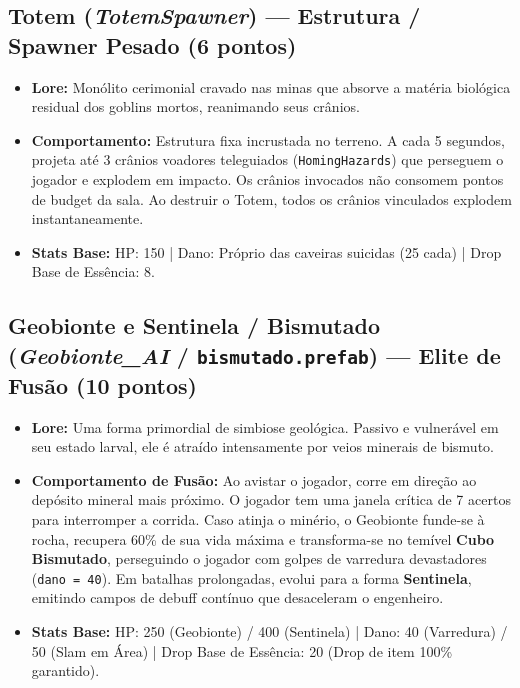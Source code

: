 \documentclass[a4paper,12pt]{report}
\begin{document}
\subsection{Totem (\textit{TotemSpawner}) --- Estrutura / Spawner Pesado (6 pontos)}
\begin{itemize}
    \item \textbf{Lore:} Monólito cerimonial cravado nas minas que absorve a matéria biológica residual dos goblins mortos, reanimando seus crânios.
    \item \textbf{Comportamento:} Estrutura fixa incrustada no terreno. A cada 5 segundos, projeta até 3 crânios voadores teleguiados (\texttt{HomingHazards}) que perseguem o jogador e explodem em impacto. Os crânios invocados não consomem pontos de budget da sala. Ao destruir o Totem, todos os crânios vinculados explodem instantaneamente.
    \item \textbf{Stats Base:} HP: 150 | Dano: Próprio das caveiras suicidas (25 cada) | Drop Base de Essência: 8.
\end{itemize}

\subsection{Geobionte e Sentinela / Bismutado (\textit{Geobionte\_AI} / \texttt{bismutado.prefab}) --- Elite de Fusão (10 pontos)}
\begin{itemize}
    \item \textbf{Lore:} Uma forma primordial de simbiose geológica. Passivo e vulnerável em seu estado larval, ele é atraído intensamente por veios minerais de bismuto.
    \item \textbf{Comportamento de Fusão:} Ao avistar o jogador, corre em direção ao depósito mineral mais próximo. O jogador tem uma janela crítica de 7 acertos para interromper a corrida. Caso atinja o minério, o Geobionte funde-se à rocha, recupera 60\% de sua vida máxima e transforma-se no temível \textbf{Cubo Bismutado}, perseguindo o jogador com golpes de varredura devastadores (\texttt{dano = 40}). Em batalhas prolongadas, evolui para a forma \textbf{Sentinela}, emitindo campos de debuff contínuo que desaceleram o engenheiro.
    \item \textbf{Stats Base:} HP: 250 (Geobionte) / 400 (Sentinela) | Dano: 40 (Varredura) / 50 (Slam em Área) | Drop Base de Essência: 20 (Drop de item 100\% garantido).
\end{itemize}
\end{document}
